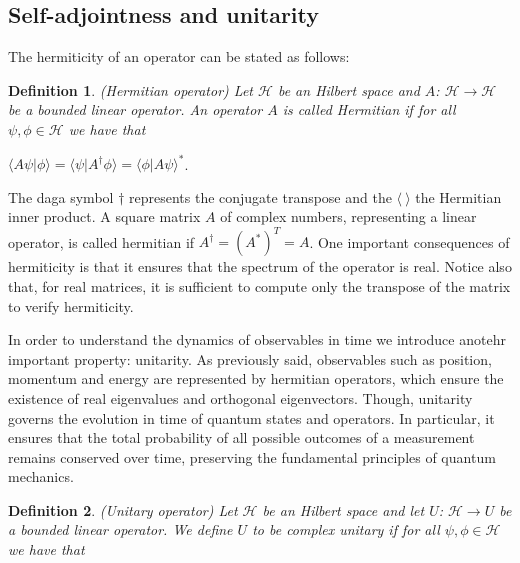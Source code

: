 \documentclass{Configuration_Files/PoliMi3i_thesis}
\newtheorem{definition}{Definition}[chapter]
\begin{document}
\subsection{Self-adjointness and unitarity}

The hermiticity of an operator can be stated as follows:

\begin{definition} (Hermitian operator) Let $\mathscr{H}$ be an Hilbert space and  $A$: $\mathscr{H} \rightarrow \mathscr{H}$ be a bounded linear operator. An operator $A$ is called Hermitian if for all $\psi,\phi \in \mathscr{H}$ we have that
\end{definition}

\begin{center}
	$\langle A\psi|\phi \rangle = \langle \psi|A^{\dagger}\phi \rangle = \langle \phi|A\psi \rangle^{*}$.
\end{center}

The daga symbol $\dagger$ represents the conjugate transpose and the $\langle \ \rangle$ the Hermitian inner product. A square matrix $A$ of complex numbers, representing a linear operator, is called hermitian if $A^{\dagger} = (A^*)^T = A$. One important consequences of hermiticity is that it ensures that the spectrum of the operator is real. Notice also that, for real matrices, it is sufficient to compute only the transpose of the matrix to verify hermiticity. \newline

In order to understand the dynamics of observables in time we introduce anotehr important property: unitarity. 
As previously said, observables such as position, momentum and energy are represented by hermitian operators, which ensure the existence of real eigenvalues and orthogonal eigenvectors. Though, unitarity governs the evolution in time of quantum states and operators. In particular, it ensures that the total probability of all possible outcomes of a measurement remains conserved over time, preserving the fundamental principles of quantum mechanics. 

\begin{definition} (Unitary operator) Let $\mathscr{H}$ be an Hilbert space and let $U$: $\mathscr{H} \rightarrow U$ be a bounded linear operator. We define $U$ to be complex unitary if for all $\psi,\phi \in \mathscr{H}$ we have that
\end{definition}
\end{document}
